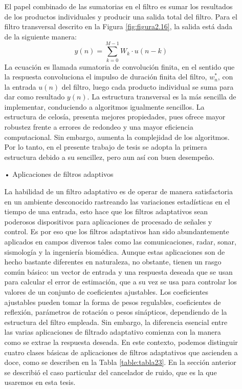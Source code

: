 \begin{enumerate}
\begin{enumerate}
\vskip 0.5cm
El papel combinado de las sumatorias en el filtro es sumar los resultados de los productos individuales y producir una salida total del filtro. Para el filtro transversal descrito en la Figura \ref{fig:figura2.16}, la salida está dada de la siguiente manera:
\begin{equation}
\label{eq:ecuacion8}
y(n) = \sum_{k=0}^{M-1}W_{k} \cdot u(n-k)
\end{equation}
La ecuación es llamada sumatoria de convolución finita, en el sentido que la respuesta convoluciona el impulso de duración finita del filtro, $w^{*}_{n}$, con la entrada $u(n)$ del filtro, luego cada producto individual se suma para dar como resultado $y(n)$.
\vskip 0.5cm
La estructura transversal es la más sencilla de implementar, conduciendo a algoritmos igualmente sencillos. La estructura de celosía, presenta mejores propiedades, pues ofrece mayor robustez frente a errores de redondeo y una mayor eficiencia computacional. Sin embargo, aumenta la complejidad de los algoritmos. Por lo tanto, en el presente trabajo de tesis se adopta la primera estructura debido a su sencillez, pero aun así con buen desempeño.

\item[•]Aplicaciones de filtros adaptivos
\par
La habilidad de un filtro adaptativo es de operar de manera satisfactoria en un ambiente desconocido rastreando las variaciones estadísticas en el tiempo de una entrada, esto hace que los filtros adaptativos sean poderosos dispositivos para aplicaciones de procesado de señales y control. Es por eso que los filtros adaptativos han sido abundantemente aplicados en campos diversos tales como las comunicaciones, radar, sonar, sismología y la ingeniería biomédica. Aunque estas aplicaciones son de hecho bastante diferentes en naturaleza, no obstante, tienen un rasgo común básico: un vector de entrada y una respuesta deseada que se usan para calcular el error de estimación, que a su vez se usa para controlar los valores de un conjunto de coeficientes ajustables. 
\newpage
Los coeficientes ajustables pueden tomar la forma de pesos regulables, coeficientes de reflexión, parámetros de rotación o pesos sinápticos, dependiendo de la estructura del filtro empleada. Sin embargo, la diferencia esencial entre las varias aplicaciones de filtrado adaptativo comienza con la manera como se extrae la respuesta deseada. En este contexto, podemos distinguir cuatro clases básicas de aplicaciones de filtros adaptativos que ascienden a doce, como se describen en la Tabla \ref{table:tabla23}. En la sección anterior se describió el caso particular del cancelador de ruido, que es la que usaremos en esta tesis.


\end{enumerate}
\end{enumerate}
